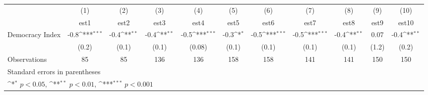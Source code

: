 {
\def\sym#1{\ifmmode^{#1}\else\(^{#1}\)\fi}
\begin{tabular}{l*{10}{c}}
\hline\hline
                    &\multicolumn{1}{c}{(1)}         &\multicolumn{1}{c}{(2)}         &\multicolumn{1}{c}{(3)}         &\multicolumn{1}{c}{(4)}         &\multicolumn{1}{c}{(5)}         &\multicolumn{1}{c}{(6)}         &\multicolumn{1}{c}{(7)}         &\multicolumn{1}{c}{(8)}         &\multicolumn{1}{c}{(9)}         &\multicolumn{1}{c}{(10)}         \\
                    &        est1         &        est2         &        est3         &        est4         &        est5         &        est6         &        est7         &        est8         &        est9         &       est10         \\
\hline
Democracy Index     &        -0.8\sym{***}&        -0.4\sym{**} &        -0.4\sym{**} &        -0.5\sym{***}&        -0.3\sym{*}  &        -0.5\sym{***}&        -0.5\sym{***}&        -0.4\sym{**} &        0.07         &        -0.4\sym{**} \\
                    &       (0.2)         &       (0.1)         &       (0.1)         &      (0.08)         &       (0.1)         &       (0.1)         &       (0.1)         &       (0.1)         &       (1.2)         &       (0.2)         \\
\hline
Observations        &          85         &          85         &         136         &         136         &         158         &         158         &         141         &         141         &         150         &         150         \\
\hline\hline
\multicolumn{11}{l}{\footnotesize Standard errors in parentheses}\\
\multicolumn{11}{l}{\footnotesize \sym{*} \(p<0.05\), \sym{**} \(p<0.01\), \sym{***} \(p<0.001\)}\\
\end{tabular}
}
